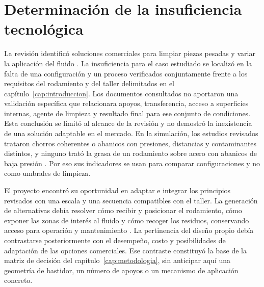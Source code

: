\section{Determinación de la insuficiencia tecnológica}

La revisión identificó soluciones comerciales para limpiar piezas pesadas y variar la aplicación del fluido \cite{stingray_6075,bvl_pacific}. La insuficiencia para el caso estudiado se localizó en la falta de una configuración y un proceso verificados conjuntamente frente a los requisitos del rodamiento y del taller delimitados en el capítulo~\ref{cap:introduccion}. Los documentos consultados no aportaron una validación específica que relacionara apoyos, transferencia, acceso a superficies internas, agente de limpieza y resultado final para ese conjunto de condiciones. Esta conclusión se limitó al alcance de la revisión y no demostró la inexistencia de una solución adaptable en el mercado. En la simulación, los estudios revisados trataron chorros coherentes o abanicos con presiones, distancias y contaminantes distintos, y ninguno trató la grasa de un rodamiento sobre acero con abanicos de baja presión \cite{carlsson2018,kou2020,fuchs2019}. Por eso sus indicadores se usan para comparar configuraciones y no como umbrales de limpieza.

El proyecto encontró su oportunidad en adaptar e integrar los principios revisados con una escala y una secuencia compatibles con el taller. La generación de alternativas debía resolver cómo recibir y posicionar el rodamiento, cómo exponer las zonas de interés al fluido y cómo recoger los residuos, conservando acceso para operación y mantenimiento \cite{skfmaintenance2011,chalk1994,udy_extraccion_2018}. La pertinencia del diseño propio debía contrastarse posteriormente con el desempeño, costo y posibilidades de adaptación de las opciones comerciales. Ese contraste constituyó la base de la matriz de decisión del capítulo~\ref{cap:metodologia}, sin anticipar aquí una geometría de bastidor, un número de apoyos o un mecanismo de aplicación concreto.
